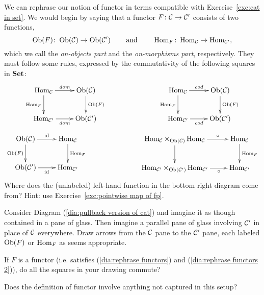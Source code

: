 \documentclass[../main/CT4S-EN-RU]{subfiles}
\begin{document}
\begin{exerciseRUS}\label{exc:list as functor}
\end{exerciseRUS}

\begin{exerciseENG}\label{exc:rephrase functors}
We can rephrase our notion of functor in terms compatible with Exercise~\ref{exc:cat in set}. We would begin by saying that a functor $F\colon\mathcal{C}\rightarrow\mathcal{C}'$ consists of two functions, $$\operatorname{Ob}(F)\colon\operatorname{Ob}(\mathcal{C})\rightarrow\operatorname{Ob}(\mathcal{C}')\hspace{.3in}\textnormal{and}\hspace{.3in}\operatorname{Hom}_F\colon\operatorname{Hom}_\mathcal{C}\rightarrow\operatorname{Hom}_{\mathcal{C}'},$$ which we call the {\em on-objects part} and the {\em on-morphisms part}, respectively. They must follow some rules, expressed by the commutativity of the following squares in ${\mathbf{Set}}$:
\begin{align}\label{dia:rephrase functors}
\xymatrix{
\Hom_\mcC\ar[r]^{dom}\ar[d]_{\Hom_F}&\Ob(\mcC)\ar[d]^{\Ob(F)}\\
\Hom_{\mcC'}\ar[r]_{dom}&\Ob(\mcC')
}
\hspace{1in}
\xymatrix{
\Hom_\mcC\ar[r]^{cod}\ar[d]_{\Hom_F}&\Ob(\mcC)\ar[d]^{\Ob(F)}\\
\Hom_{\mcC'}\ar[r]_{cod}&\Ob(\mcC')}
\end{align}
\begin{align}\label{dia:rephrase functors 2}
\xymatrix{
\Ob(\mcC)\ar[d]_{\Ob(F)}\ar[r]^{\id}&\Hom_\mcC\ar[d]^{\Hom_F}\\
\Ob(\mcC')\ar[r]_{\id}&\Hom_{\mcC'}
}
\hspace{1in}
\xymatrix{
\Hom_\mcC\times_{\Ob(\mcC)}\Hom_{\mcC}\ar[r]^-{\circ}\ar[d]_{}&\Hom_\mcC\ar[d]^{\Hom_F}\\
\Hom_{\mcC'}\times_{\Ob(\mcC')}\Hom_{\mcC'}\ar[r]_-{\circ}&\Hom_{\mcC'}}
\end{align}
Where does the (unlabeled) left-hand function in the bottom right diagram come from? Hint: use Exercise~\ref{exc:pointwise map of fp}.

Consider Diagram (\ref{dia:pullback version of cat}) and imagine it as though contained in a pane of glass. Then imagine a parallel pane of glass involving $\mathcal{C}'$ in place of $\mathcal{C}$ everywhere. 
\sexc Draw arrows from the $\mathcal{C}$ pane to the $\mathcal{C}'$ pane, each labeled $\operatorname{Ob}(F)$ or $\operatorname{Hom}_F$ as seems appropriate.
\item If $F$ is a functor (i.e. satisfies (\ref{dia:rephrase functors}) and (\ref{dia:rephrase functors 2})), do all the squares in your drawing commute?
\item  Does the definition of functor involve anything not captured in this setup?
\endsexc
\end{exerciseENG}
\end{document}
